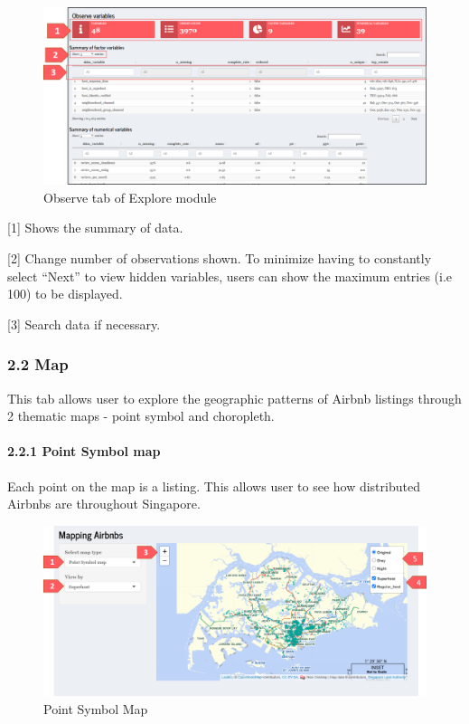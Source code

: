 \documentclass[
  12pt,
]{article}
\begin{document}
\begin{figure}[H]

{\centering \includegraphics[width=1\linewidth]{images/observe} 

}

\caption{Observe tab of Explore module}\label{fig:unnamed-chunk-2}
\end{figure}

{[}1{]} Shows the summary of data.

{[}2{]} Change number of observations shown. To minimize having to
constantly select ``Next'' to view hidden variables, users can show the
maximum entries (i.e 100) to be displayed.

{[}3{]} Search data if necessary.

\hypertarget{map}{%
\subsubsection{2.2 Map}\label{map}}

This tab allows user to explore the geographic patterns of Airbnb
listings through 2 thematic maps - point symbol and choropleth.

\hypertarget{point-symbol-map}{%
\paragraph{2.2.1 Point Symbol map}\label{point-symbol-map}}

Each point on the map is a listing. This allows user to see how
distributed Airbnbs are throughout Singapore.

\begin{figure}[H]

{\centering \includegraphics[width=1\linewidth]{images/map} 

}

\caption{Point Symbol Map}\label{fig:unnamed-chunk-3}
\end{figure}
\end{document}
